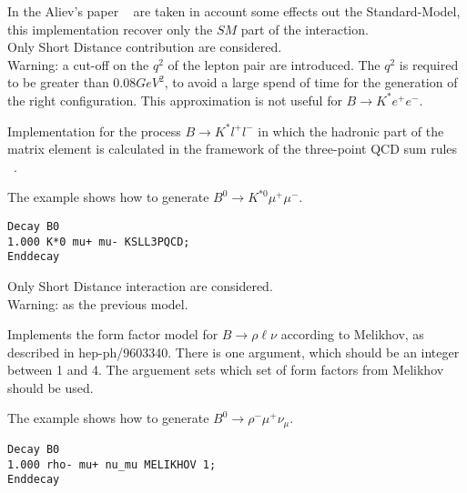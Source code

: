\Notes
In the Aliev's paper ~\cite{Aliev97} are taken in account some
effects out the Standard-Model, this implementation recover only
the $SM$ part of the interaction. \\
Only Short Distance contribution are considered.\\
Warning: a cut-off on the $q^2$ of the lepton pair are introduced. 
The $q^2$ is required to be greater than $0.08 GeV^2$, 
to avoid a large spend of time for the generation of the 
right configuration. This approximation is 
not useful for $B\rightarrow K^* e^+ e^-$.   





\label{KSLL3PQCD}



\Expl
Implementation for the process $B\rightarrow K^* l^+ l^-$ in which the hadronic 
part of the matrix element is calculated in the framework of the three-point QCD 
sum rules ~\cite{Colangelo96}.
 
\Example
The example shows how to generate $B^0\rightarrow K^{*0} \mu^+ \mu^-$.
\begin{verbatim}
Decay B0
1.000 K*0 mu+ mu- KSLL3PQCD;
Enddecay
\end{verbatim}

\Notes
Only Short Distance interaction are considered.\\
Warning: as the previous model.





\label{MELIKHOV}



\Expl
Implements the form factor model for $B \rightarrow \rho \ell \nu$
according to Melikhov, as described in hep-ph/9603340.  There is
one argument, which should be an integer between 1 and 4.  The
arguement sets which set of form factors from Melikhov should be used.  
 
\Example
The example shows how to generate $B^0\rightarrow \rho^- \mu^+ \nu_{\mu}$.
\begin{verbatim}
Decay B0
1.000 rho- mu+ nu_mu MELIKHOV 1;
Enddecay
\end{verbatim}

\Notes


\label{omegadalitz}

